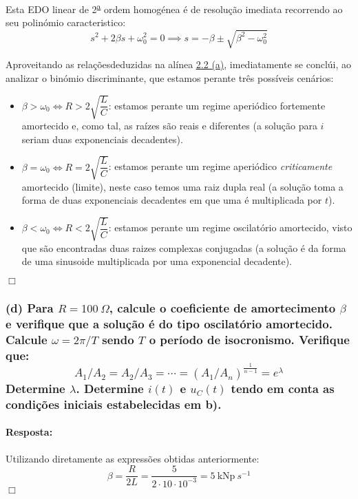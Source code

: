 Esta EDO linear de 2\textsuperscript{\underline{a}} ordem homogénea é de resolução imediata recorrendo ao seu polinómio caracteristico:
$$
    s^2 + 2\beta s + \omega_0^2 = 0 \implies s = -\beta \pm \sqrt{\beta^2 - \omega_0^2}
$$

Aproveitando as relações\footnotemark[2] deduzidas na alínea \hyperref[subsubsec_a2]{\underline{2.2} (a)}, imediatamente se conclúi, ao analizar o binómio discriminante, que estamos perante três possíveis cenários:

\begin{itemize}
  \item $\beta > \omega_0 \iff R > 2\sqrt{\dfrac{L}{C}}$: estamos perante um regime aperiódico fortemente amortecido e, como tal, as raízes são reais e diferentes (a solução para $i$ seriam duas exponenciais decadentes).   
  \item $\beta = \omega_0 \iff R = 2\sqrt{\dfrac{L}{C}}$: estamos perante um regime aperiódico \textit{criticamente} amortecido (limite), neste caso temos uma raiz dupla real (a solução toma a forma de duas exponenciais decadentes em que uma é multiplicada por $t$).
  \item $\beta < \omega_0 \iff R < 2\sqrt{\dfrac{L}{C}}$: estamos perante um regime oscilatório amortecido, visto que são encontradas duas raizes complexas conjugadas (a solução é da forma de uma sinusoide multiplicada por uma exponencial decadente).
\end{itemize}
\hfill \ensuremath{\Box}

\subsubsection*{(d) Para ${R = 100\ \Omega}$, calcule o coeficiente de amortecimento ${\beta}$ e verifique que a solução é do tipo oscilatório amortecido. Calcule ${\omega = 2\pi/T}$ sendo ${T}$ o período de isocronismo. Verifique que: \\ $$ A_1/A_2 = A_2/A_3 = \cdots = (A_1/A_n)^{\frac{1}{n-1}} = e^{\lambda}$$ Determine $\lambda$. Determine $i(t)$ e $u_C(t)$ tendo em conta as condições iniciais estabelecidas em b).}
\label{subsubsec_d2}
\paragraph{Resposta:}
Utilizando diretamente as expressões obtidas anteriormente:
$$
    \beta = \frac{R}{2L} = \frac{5}{2\cdot 10\cdot 10^{-3}} = 5\ \text{kNp}\ s^{-1}
$$
\hfill \ensuremath{\Box}

